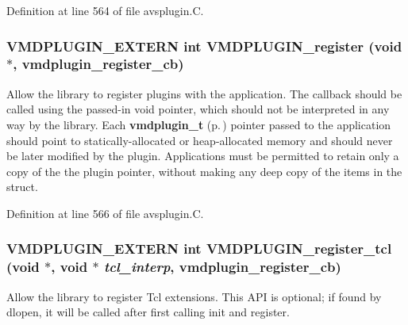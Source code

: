 Definition at line 564 of file avsplugin.C.
\subsubsection{\setlength{\rightskip}{0pt plus 5cm}VMDPLUGIN\_\-EXTERN int VMDPLUGIN\_\-register (void $\ast$, {\bf vmdplugin\_\-register\_\-cb})}\label{vmdplugin_8h_a17}


Allow the library to register plugins with the application. The callback should be called using the passed-in void pointer, which should not be interpreted in any way by the library. Each {\bf vmdplugin\_\-t} {\rm (p.\,\pageref{structvmdplugin__t})} pointer passed to the application should point to statically-allocated or heap-allocated memory and should never be later modified by the plugin. Applications must be permitted to retain only a copy of the the plugin pointer, without making any deep copy of the items in the struct. 

Definition at line 566 of file avsplugin.C.
\subsubsection{\setlength{\rightskip}{0pt plus 5cm}VMDPLUGIN\_\-EXTERN int VMDPLUGIN\_\-register\_\-tcl (void $\ast$, void $\ast$ {\em tcl\_\-interp}, {\bf vmdplugin\_\-register\_\-cb})}\label{vmdplugin_8h_a18}


Allow the library to register Tcl extensions.  This API is optional; if found by dlopen, it will be called after first calling init and register. 